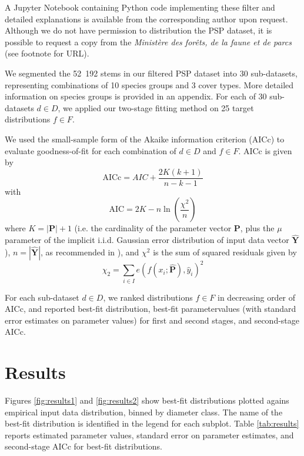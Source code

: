 \message{ !name(pspdistfit_article.tex)}\documentclass{article}
\begin{document}
A Jupyter Notebook containing Python code implementing these filter and detailed explanations is available from the corresponding author upon request.
Although we do not have permission to distribution the PSP dataset, it is possible to request a copy from the \emph{Ministère des forêts, de la faune et de parcs} (see footnote for URL).

We segmented the 52~192 stems in our filtered PSP dataset into 30 sub-datasets, representing combinations of 10 species groups and 3 cover types.
More detailed information on species groups is provided in an appendix. 
For each of 30 sub-datasets $d \in D$, we applied our two-stage fitting method on 25 target distributions $f \in F$.



We used the small-sample form of the Akaike information criterion (AICc) to evaluate goodness-of-fit for each combination of $d \in D$ and $f \in F$. AICc is given by
\begin{equation}
\text{AICc} = AIC + \frac{2K(k + 1)}{n - k - 1}
\end{equation}
with 
\begin{equation}
\text{AIC} = 2K - n\ln\left(\frac{\chi^2}{n}\right)
\end{equation}
where $K=|\mathbf{P}|+1$ (i.e. the cardinality of the parameter vector $\mathbf{P}$, plus the $\mu$ parameter of the implicit i.i.d. Gaussian error distribution of input data vector $\mathbf{\hat{Y}}$), $n=|\mathbf{\hat{Y}}|$, as recommended in \citealp{burnham2002model}), and $\chi^2$ is the sum of squared residuals given by
\begin{equation}
\chi_2 = \sum_{i \in I} e\left(f(x_i; \bm{\hat{P}}), \hat{y}_i\right)^2
\end{equation}

For each sub-dataset $d \in D$, we ranked distributions $f \in F$ in decreasing order of AICc, and reported best-fit distribution, best-fit parametervalues (with standard error estimates on parameter values) for first and second stages, and second-stage AICc.

\section{Results}
\label{sec:results}

Figures \ref{fig:results1} and \ref{fig:results2} show best-fit distributions plotted agains empirical input data distribution, binned by diameter class. The name of the best-fit distribution is identified in the legend for each subplot.
Table \ref{tab:results} reports estimated parameter values, standard error on parameter estimates, and second-stage AICc for best-fit distributions. 
\end{document}
